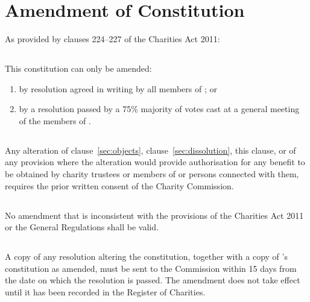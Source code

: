 \section{Amendment of Constitution}\label{sec:constitution}
As provided by clauses 224--227 of the Charities Act 2011:

    \subsection{}
    This constitution can only be amended:
    \begin{enumerate}
        \item by resolution agreed in writing by all members of \shortname{}; or
        \item by a resolution passed by a 75\% majority of votes cast at a general meeting of the members of \shortname{}.
    \end{enumerate}

    \subsection{}
    Any alteration of clause~\ref{sec:objects}, clause~\ref{sec:dissolution}, this clause, or of any provision where the alteration would provide authorisation for any benefit to be obtained by charity trustees or members of \shortname{} or persons connected with them, requires the prior written consent of the Charity Commission.

    \subsection{}
    No amendment that is inconsistent with the provisions of the Charities Act 2011 or the General Regulations shall be valid.

    \subsection{}
    A copy of any resolution altering the constitution, together with a copy of \shortname{}’s constitution as amended, must be sent to the Commission within 15 days from the date on which the resolution is passed. The amendment does not take effect until it has been recorded in the Register of Charities.
